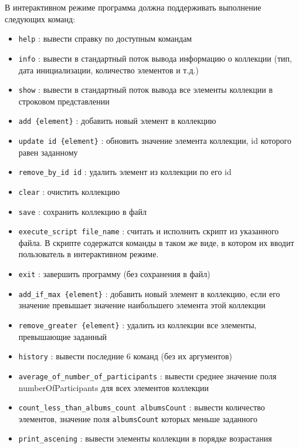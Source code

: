 \noindent
В интерактивном режиме программа должна поддерживать выполнение следующих команд:
\begin{itemize}
\setlength{\itemsep}{0pt}
    \setlength{\parskip}{0pt}
    \setlength{\parsep}{0pt}
\item \verb|help| : вывести справку по доступным командам
\item \verb|info| : вывести в стандартный поток вывода информацию о коллекции (тип, дата инициализации, количество элементов и т.д.)
\item \verb|show| : вывести в стандартный поток вывода все элементы коллекции в строковом представлении
\item \verb|add {element}| : добавить новый элемент в коллекцию
\item \verb|update id {element}| : обновить значение элемента коллекции, id которого равен заданному
\item \verb|remove_by_id id| : удалить элемент из коллекции по его id
\item \verb|clear| : очистить коллекцию
\item \verb|save| : сохранить коллекцию в файл
\item \verb|execute_script file_name| : считать и исполнить скрипт из указанного файла. В скрипте содержатся команды в таком же виде, в котором их вводит пользователь в интерактивном режиме.
\item \verb|exit| : завершить программу (без сохранения в файл)
\item \verb|add_if_max {element}| : добавить новый элемент в коллекцию, если его значение превышает значение наибольшего элемента этой коллекции
\item \verb|remove_greater {element}| : удалить из коллекции все элементы, превышающие заданный
\item \verb|history| : вывести последние 6 команд (без их аргументов)
\item \verb|average_of_number_of_participants| : вывести среднее значение поля numberOfParticipants для всех элементов коллекции
\item \verb|count_less_than_albums_count albumsCount| : вывести количество элементов, значение поля \verb|albumsCount| которых меньше заданного
\item \verb|print_ascening| : вывести элементы коллекции в порядке возрастания
\end{itemize}

